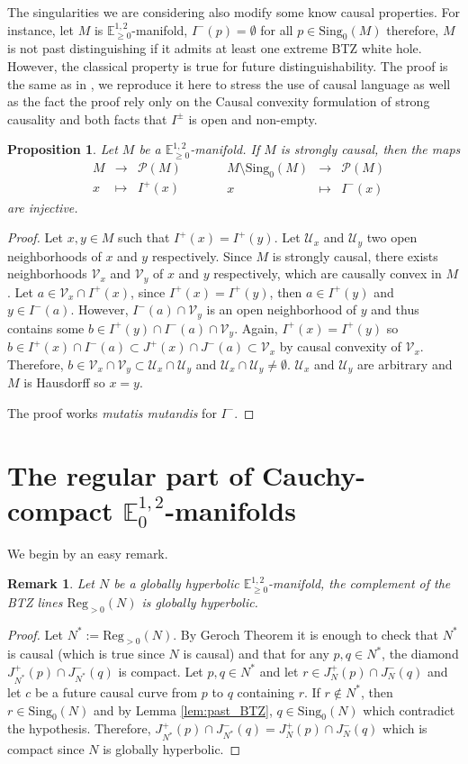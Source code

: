 \documentclass[a4paper,12pt]{article}
\def\U{\mathcal U}
\def\V{\mathcal V}
\def\sing{\mathrm{Sing}}
\newcommand{\mass}[1]{{\mathbb E}^{1,2}_{#1}}
\def\Reg{\mathrm{Reg}}
\def\reg{\Reg}
\newcommand{\fonctionn}[4]{\displaystyle\begin{array}{l|rcl}
& \displaystyle #1 & \longrightarrow & \displaystyle #2 \\
    & \displaystyle #3 & \longmapsto & \displaystyle #4 \end{array}}
\newtheorem{propou}[lemou]{Proposition}
\newtheorem{remark}{Remark}             %
\begin{document}
The singularities we are considering also modify some know causal properties. For instance, let $M$ is $\mass{\geq0}$-manifold, $I^-(p)=\emptyset$ for all $p\in \sing_0(M)$  therefore, $M$ is not past distinguishing if it admits at least one extreme BTZ white hole. However, the classical property is true for future distinguishability.  The proof is the same as in \cite{MR0469146}, we reproduce it here to stress the use of causal language as well as the fact the proof rely only on the Causal convexity formulation of strong causality and both facts that $I^{\pm}$ is open and non-empty. 


			\begin{propou} \label{prop:FZenon_injectif}Let $M$ be a $\mass{\geq0}$-manifold. If $M$ is strongly causal, then
			the maps $$\fonctionn{M}{\mathcal{P}(M)}{x}{I^+(x)}\quad \quad \fonctionn{M\setminus\sing_0(M)}{\mathcal{P}(M)}{x}{I^-(x)}$$
			are injective.
			\end{propou}
			\begin{proof}
			Let $x,y\in M$ such that $I^+(x)= I^+(y)$. Let $\U_x$ and $\U_y$ two open neighborhoods of $x$ and $y$ respectively. Since $M$ is strongly causal, there exists neighborhoods $\V_x$ and $\V_y$ of $x$ and $y$ respectively, which are causally convex in $M$. Let $a\in \V_x\cap I^+(x)$, since $I^+(x)=I^+(y)$, then $a\in I^+(y)$ and $y\in I^-(a)$. However, $I^-(a)\cap \V_y$ is an open neighborhood of $y$ and thus contains some $b\in I^+(y)\cap I^-(a)\cap \V_y$. 
Again, $I^+(x)=I^+(y)$ so $b\in I^+(x)\cap I^-(a)\subset J^+(x)\cap J^-(a)\subset \V_x$ by causal convexity of $\V_x$. 
Therefore, $b\in \V_x \cap \V_y \subset \U_x\cap \U_y$ and $\U_x\cap \U_y\neq \emptyset$.  
$\U_x$ and $\U_y$ are arbitrary and $M$ is Hausdorff so $x=y$.

The proof works {\it mutatis mutandis} for $I^-$.
			\end{proof}


\section{The regular part of Cauchy-compact $\mass{0}$-manifolds}
\label{sec:reg_BTZ}

 We begin by an easy remark.
 \begin{remark}\label{rem:reg_GH} Let $N$ be a globally hyperbolic $\mass{\geq0}$-manifold, the complement of the BTZ lines $\reg_{>0}(N)$ is globally hyperbolic.
 \end{remark}
 \begin{proof} Let $N^*:=\reg_{>0}(N)$.
 By Geroch Theorem it is enough to check that $N^*$ is causal (which is true since $N$ is causal) and that for any $p,q\in N^*$, the diamond $J^+_{N^*}(p)\cap J^-_{N^*}(q)$ is compact.  
 Let $p,q\in N^*$ and let $r\in J^+_{N}(p)\cap J^-_{N}(q)$ and let $c$ be a future causal curve from $p$ to $q$ containing $r$. If $r\notin N^*$, then $r\in \sing_0(N)$ and by Lemma \ref{lem:past_BTZ}, $q\in \sing_0(N)$ which contradict the hypothesis. 
 Therefore, $J^+_{N^*}(p)\cap J^-_{N^*}(q) = J^+_{N}(p)\cap J^-_{N}(q)$ which is compact since $N$ is globally hyperbolic.
 \end{proof}
 
\end{document}
